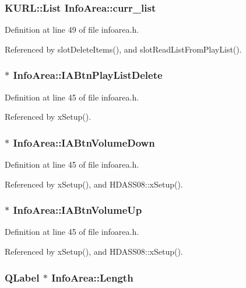 \subsubsection{\setlength{\rightskip}{0pt plus 5cm}KURL::List {\bf Info\-Area::curr\_\-list}}\label{classInfoArea_InfoAreao5}




Definition at line 49 of file infoarea.h.

Referenced by slot\-Delete\-Items(), and slot\-Read\-List\-From\-Play\-List().
\subsubsection{ $\ast$ {\bf Info\-Area::IABtn\-Play\-List\-Delete}}\label{classInfoArea_InfoAreao2}




Definition at line 45 of file infoarea.h.

Referenced by x\-Setup().
\subsubsection{ $\ast$ {\bf Info\-Area::IABtn\-Volume\-Down}}\label{classInfoArea_InfoAreao1}




Definition at line 45 of file infoarea.h.

Referenced by x\-Setup(), and HDASS08::x\-Setup().
\subsubsection{$\ast$ {\bf Info\-Area::IABtn\-Volume\-Up}}\label{classInfoArea_InfoAreao0}




Definition at line 45 of file infoarea.h.

Referenced by x\-Setup(), and HDASS08::x\-Setup().
\subsubsection{\setlength{\rightskip}{0pt plus 5cm}QLabel $\ast$ {\bf Info\-Area::Length}\hspace{0.3cm}{\tt  [private]}}\label{classInfoArea_InfoArear4}





